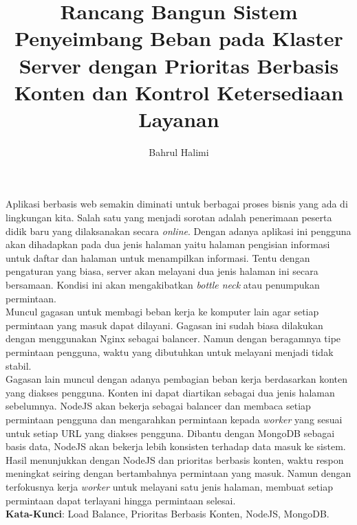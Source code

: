 \documentclass{ta-its}
\title{Rancang Bangun Sistem Penyeimbang Beban pada Klaster Server dengan Prioritas Berbasis Konten dan Kontrol Ketersediaan Layanan}{Design and Implementation of Load Balancing System with Content Priority and Availability Control}{KI141502}
\author{Bahrul Halimi}{5111100014}
\begin{document}
    \frontmatter %
    \maketitle
    \legalityPaper %
    \begin{abstrak}
    	Aplikasi berbasis web semakin diminati untuk berbagai proses bisnis yang ada di lingkungan kita. Salah satu yang menjadi sorotan adalah penerimaan peserta didik baru yang dilaksanakan secara \textit{online}. Dengan adanya aplikasi ini pengguna akan dihadapkan pada dua jenis halaman yaitu halaman pengisian informasi untuk daftar dan halaman untuk menampilkan informasi. Tentu dengan pengaturan yang biasa, server akan melayani dua jenis halaman ini secara bersamaan. Kondisi ini akan mengakibatkan \textit{bottle neck} atau penumpukan permintaan. \\
	    Muncul gagasan untuk membagi beban kerja ke komputer lain agar setiap permintaan yang masuk dapat dilayani. Gagasan ini sudah biasa dilakukan dengan menggunakan Nginx sebagai balancer. Namun dengan beragamnya tipe permintaan pengguna, waktu yang dibutuhkan untuk melayani menjadi tidak stabil. \\
	    Gagasan lain muncul dengan adanya pembagian beban kerja berdasarkan konten yang diakses pengguna. Konten ini dapat diartikan sebagai dua jenis halaman sebelumnya. NodeJS akan bekerja sebagai balancer dan membaca setiap permintaan pengguna dan mengarahkan permintaan kepada \textit{worker} yang sesuai untuk setiap URL yang diakses pengguna. Dibantu dengan MongoDB sebagai basis data, NodeJS akan bekerja lebih konsisten terhadap data masuk ke sistem. \\
	    Hasil menunjukkan dengan NodeJS dan prioritas berbasis konten, waktu respon meningkat seiring dengan bertambahnya permintaan yang masuk. Namun dengan terfokusnya kerja \textit{worker} untuk melayani satu jenis halaman, membuat setiap permintaan dapat terlayani hingga permintaan selesai. \\
    	
    	\noindent \textbf{Kata-Kunci}: Load Balance, Prioritas Berbasis Konten, NodeJS, MongoDB.
	\end{abstrak}
	
\end{document}
